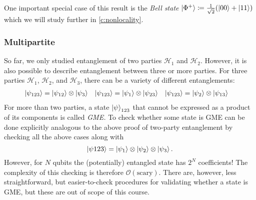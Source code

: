			One important special case of this result is the \emph{Bell state} \(\ket{\Phi^+} \coloneqq \frac{1}{\sqrt{2}} (\ket{00} + \ket{11})\) which we will study further in \autoref{c:nonlocality}.

			\subsubsection{Multipartite}
				So far, we only studied entanglement of two parties \(\mathcal{H}_1\) and \(\mathcal{H}_2\). However, it is also possible to describe entanglement between three or more parties. For three parties \(\mathcal{H}_1\), \(\mathcal{H}_2\), and \(\mathcal{H}_3\), there can be a variety of different entanglements:
				\begin{align}
					\ket{\psi_{123}} & = \ket{\psi_{12}} \otimes \ket{\psi_3} &
					\ket{\psi_{123}} & = \ket{\psi_1} \otimes \ket{\psi_{23}} &
					\ket{\psi_{123}} & = \ket{\psi_2} \otimes \ket{\psi_{13}}
				\end{align}
				For more than two parties, a state \(\ket{\psi}_{123}\) that cannot be expressed as a product of its components is called \emph{\ac{GME}.} To check whether some state is \ac{GME} can be done explicitly analogous to the above proof of two-party entanglement by checking all the above cases along with
				\begin{equation}
					\ket{\psi{123}} = \ket{\psi_1} \otimes \ket{\psi_2} \otimes \ket{\psi_3}.
				\end{equation}
				However, for \(N\) qubits the (potentially) entangled state has \(2^N\) coefficients! The complexity of this checking is therefore \(\mathcal{O}(\text{scary})\). There are, however, less straightforward, but easier-to-check procedures for validating whether a state is \ac{GME}, but these are out of scope of this course.

